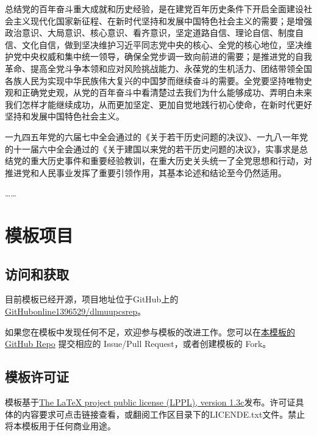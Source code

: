 \documentclass[12pt]{dlmuupcsrep}
\begin{document}
总结党的百年奋斗重大成就和历史经验，是在建党百年历史条件下开启全面建设社会主义现代化国家新征程、在新时代坚持和发展中国特色社会主义的需要；是增强政治意识、大局意识、核心意识、看齐意识，坚定道路自信、理论自信、制度自信、文化自信，做到坚决维护习近平同志党中央的核心、全党的核心地位，坚决维护党中央权威和集中统一领导，确保全党步调一致向前进的需要；是推进党的自我革命、提高全党斗争本领和应对风险挑战能力、永葆党的生机活力、团结带领全国各族人民为实现中华民族伟大复兴的中国梦而继续奋斗的需要。全党要坚持唯物史观和正确党史观，从党的百年奋斗中看清楚过去我们为什么能够成功、弄明白未来我们怎样才能继续成功，从而更加坚定、更加自觉地践行初心使命，在新时代更好坚持和发展中国特色社会主义。

一九四五年党的六届七中全会通过的《关于若干历史问题的决议》、一九八一年党的十一届六中全会通过的《关于建国以来党的若干历史问题的决议》，实事求是总结党的重大历史事件和重要经验教训，在重大历史关头统一了全党思想和行动，对推进党和人民事业发挥了重要引领作用，其基本论述和结论至今仍然适用。

……

\section{模板项目}

\subsection{访问和获取}

目前模板已经开源，项目地址位于GitHub上的\href{https://github.com/GitHubonline1396529/dlmuupcsrep}{GitHubonline1396529/dlmuupcsrep}。

如果您在模板中发现任何不足，欢迎参与模板的改进工作。您可以在\href{https://github.com/GitHubonline1396529/dlmuupcsrep}{本模板的 GitHub Repo} 提交相应的 Issue/Pull Request，或者创建模板的 Fork。

\subsection{模板许可证}

模板基于\href{https://www.latex-project.org/lppl/lppl-1-3c/}{The LaTeX project public license (LPPL), version 1.3c}发布。许可证具体的内容要求可点击链接查看，或翻阅工作区目录下的LICENDE.txt文件。禁止将本模板用于任何商业用途。
\end{document}
